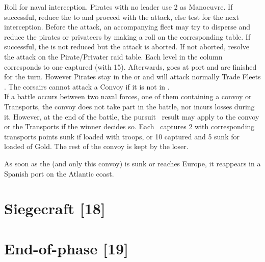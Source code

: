 \bparag Roll for naval interception. Pirates with no leader use 2
as Manoeuvre.  If successful, reduce the \corsaire to \Facemoins and proceed with the attack, 
else test for the next interception.
\bparag Before the attack, an accompanying fleet may try to disperse and
reduce the pirates or privateers by making a roll on the corresponding
table.  If successful, the \corsaire is not reduced but the attack is aborted.
\bparag If not aborted, resolve the attack on the  Pirate/Privater raid table.
\bparag Each level in the column \TradeFLEET\faceplus corresponds to one \NTD
captured (with 15\ducats).
\bparag Afterwards, \corsaire goes at port and are finished for the
turn. However Pirates stay in the \CTZ or \STZ and will attack normally Trade
Fleets .
\bparag The  corsairs cannot attack a Convoy if it is
not in . \\
{} If a battle occurs between two naval forces,
one of them containing a convoy or Transports, the convoy does not take
part in the battle, nor incurs losses during it.
\bparag However, at the end of the battle, the pursuit \textetoilex\ 
result may apply to the convoy or the Transports if the winner decides
so.
\bparag Each \textetoilex\ captures 2 \NTD with corresponding transports
points sunk if loaded with troops, or 10 \ducats captured and 5 \ducats
sunk for \NTD loaded of Gold.
\bparag The rest of the convoy is kept by the loser. 

 \label{chMilitary:FlotaDeOroMovement} As soon as the
\terme{Flota de Oro} (and only this convoy) is sunk or reaches Europe, it
reappears in a Spanish port on the Atlantic coast. %

%
%

\section{Siegecraft [18]}

\section{End-of-phase [19]}

